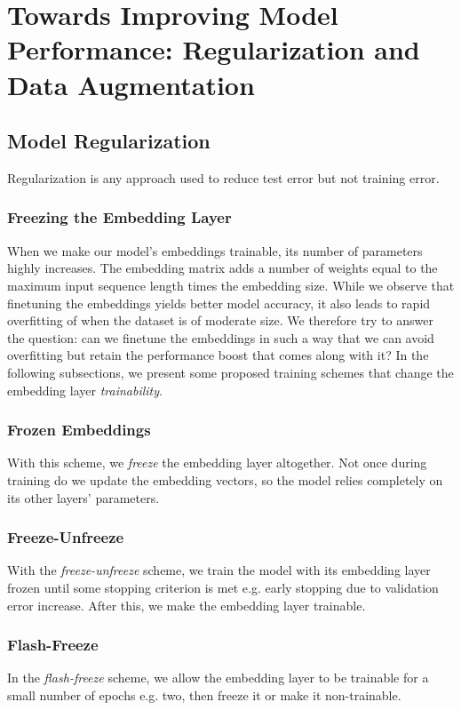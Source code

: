 
\chapter{Towards Improving Model Performance: Regularization and Data Augmentation}

\section{Model Regularization}
Regularization is any approach used to reduce test error but not training error.


\subsection{Freezing the Embedding Layer}
When we make our model's embeddings trainable, its number of parameters highly increases. The embedding matrix
adds a number of weights equal to the maximum input sequence length times the embedding size.
While we observe that finetuning the embeddings yields better model accuracy, it also leads to rapid overfitting
of when the dataset is of moderate size. We therefore try to answer the question: can we finetune the embeddings
in such a way that we can avoid overfitting but retain the performance boost that comes along with it?
In the following subsections, we present some proposed training schemes that change the embedding layer \textit{trainability}.

\subsection{Frozen Embeddings}
With this scheme, we \textit{freeze} the embedding layer altogether. Not once during training do we update
the embedding vectors, so the model relies completely on its other layers' parameters.

\subsection{Freeze-Unfreeze}
With the \textit{freeze-unfreeze} scheme, we train the model with its embedding layer frozen until some
stopping criterion is met e.g. early stopping due to validation error increase. After this, we make the
embedding layer trainable.

\subsection{Flash-Freeze}
In the \textit{flash-freeze} scheme, we allow the embedding layer to be trainable for a small number of
epochs e.g. two, then freeze it or make it non-trainable.

